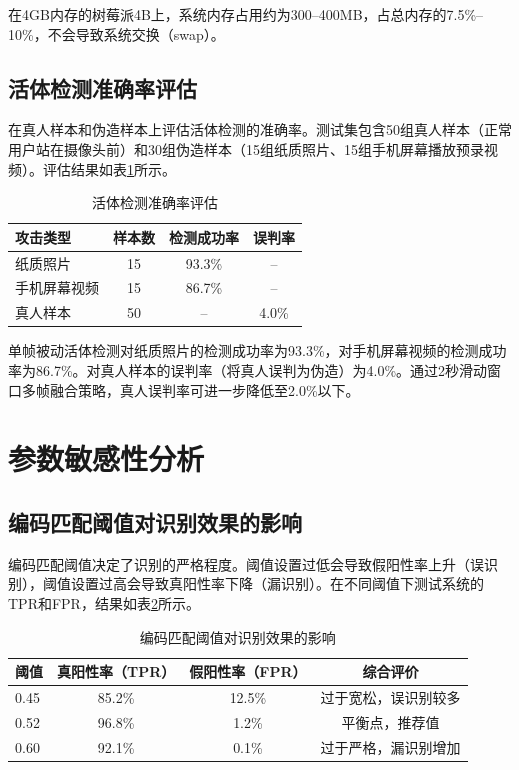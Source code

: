 在4GB内存的树莓派4B上，系统内存占用约为300--400MB，占总内存的7.5\%--10\%，不会导致系统交换（swap）。

\subsection{活体检测准确率评估}

在真人样本和伪造样本上评估活体检测的准确率。测试集包含50组真人样本（正常用户站在摄像头前）和30组伪造样本（15组纸质照片、15组手机屏幕播放预录视频）。评估结果如表\ref{tab:liveness}所示。

\begin{table}[htbp]
    \centering
    \caption{活体检测准确率评估}
    \label{tab:liveness}
    \begin{tabular}{lccc}
        \toprule
        \textbf{攻击类型} & \textbf{样本数} & \textbf{检测成功率} & \textbf{误判率} \\
        \midrule
        纸质照片 & 15 & 93.3\% & -- \\
        手机屏幕视频 & 15 & 86.7\% & -- \\
        真人样本 & 50 & -- & 4.0\% \\
        \bottomrule
    \end{tabular}
\end{table}

单帧被动活体检测对纸质照片的检测成功率为93.3\%，对手机屏幕视频的检测成功率为86.7\%。对真人样本的误判率（将真人误判为伪造）为4.0\%。通过2秒滑动窗口多帧融合策略，真人误判率可进一步降低至2.0\%以下。

\section{参数敏感性分析}

\subsection{编码匹配阈值对识别效果的影响}

编码匹配阈值决定了识别的严格程度。阈值设置过低会导致假阳性率上升（误识别），阈值设置过高会导致真阳性率下降（漏识别）。在不同阈值下测试系统的TPR和FPR，结果如表\ref{tab:threshold}所示。

\begin{table}[htbp]
    \centering
    \caption{编码匹配阈值对识别效果的影响}
    \label{tab:threshold}
    \begin{tabular}{lccc}
        \toprule
        \textbf{阈值} & \textbf{真阳性率（TPR）} & \textbf{假阳性率（FPR）} & \textbf{综合评价} \\
        \midrule
        0.45 & 85.2\% & 12.5\% & 过于宽松，误识别较多 \\
        0.52 & 96.8\% & 1.2\% & 平衡点，推荐值 \\
        0.60 & 92.1\% & 0.1\% & 过于严格，漏识别增加 \\
        \bottomrule
    \end{tabular}
\end{table}

